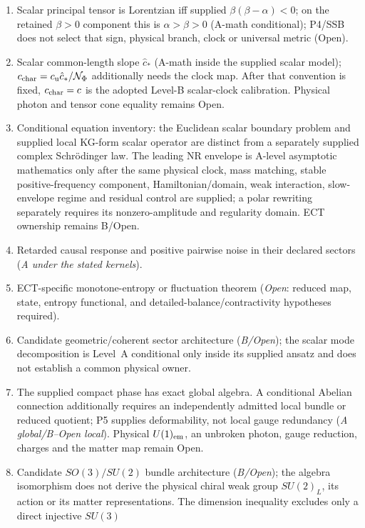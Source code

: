 \documentclass[11pt,a4paper]{article}
\begin{document}
\begin{enumerate}
\item Scalar principal tensor is Lorentzian iff supplied $\beta(\beta-\alpha)<0$; on the retained $\beta>0$ component this is $\alpha>\beta>0$ (A-math conditional); P4/SSB does not select that sign, physical branch, clock or universal metric (Open).
\item Scalar common-length slope $\hat c_*$ (A-math inside the supplied scalar model); $c_{\rm char}=c_{\rm u}\hat c_*/\mathcal N_\Phi$ additionally needs the clock map.  After that convention is fixed, $c_{\rm char}=c$ is the adopted Level-B scalar-clock calibration.  Physical photon and tensor cone equality remains Open.
\item Conditional equation inventory: the Euclidean scalar boundary problem and supplied local KG-form scalar operator are distinct from a separately supplied complex Schr\"odinger law.  The leading NR envelope is A-level asymptotic mathematics only after the same physical clock, mass matching, stable positive-frequency component, Hamiltonian/domain, weak interaction, slow-envelope regime and residual control are supplied; a polar rewriting separately requires its nonzero-amplitude and regularity domain.  ECT ownership remains B/Open.
\item Retarded causal response and positive pairwise noise in their declared sectors (\emph{A under the stated kernels}).
\item ECT-specific monotone-entropy or fluctuation theorem (\emph{Open}: reduced map, state, entropy functional, and detailed-balance/contractivity hypotheses required).
\item Candidate geometric/coherent sector architecture (\emph{B/Open}); the
scalar mode decomposition is Level~A conditional only inside its supplied
ansatz and does not establish a common physical owner.
\item The supplied compact phase has exact global algebra.  A conditional Abelian connection additionally requires an independently admitted local bundle or reduced quotient; P5 supplies deformability, not local gauge redundancy (\emph{A global/B--Open local}).  Physical $U(1)_{\rm em}$, an unbroken photon, gauge reduction, charges and the matter map remain Open.
\item Candidate $SO(3)/SU(2)$ bundle architecture
  (\emph{B/Open}); the algebra isomorphism does not derive the physical
  chiral weak group $SU(2)_L$, its action or its matter representations.
  The dimension inequality excludes only a direct injective $SU(3)$

\end{enumerate}
\end{document}
